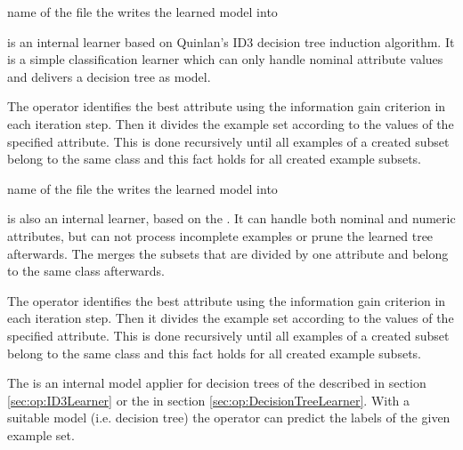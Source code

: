
\learnerio

\begin{parameters}
 name of the file the  writes the learned model into
\end{parameters}

\opdescr {} is an internal learner based on Quinlan's \cite{Quinlan/93b} 
ID3 decision tree induction algorithm. 
It is a simple classification learner which can
only handle nominal attribute values and delivers a decision tree as model.

The operator identifies the best attribute using the information gain criterion in each iteration step. 
Then it divides the example set according to the values of the specified attribute. 
This is done recursively until all examples of a created subset belong to the
same class and this fact holds for all created example subsets.



\learnerio

\begin{parameters}
 name of the file the  writes the learned model into
\end{parameters}

\opdescr {} is also an internal learner, based on
the . It can handle both nominal and numeric
attributes, but can not process incomplete examples or prune the learned tree
afterwards. The  merges the subsets that are divided
by one attribute and belong to the same class afterwards.

The operator identifies the best attribute using the information gain
criterion in each iteration step. 
Then it divides the example set according to the values of the specified attribute. 
This is done recursively until all examples of a created subset belong to the
same class and this fact holds for all created example subsets.
 



\applierio

\opdescr The  is an internal model applier for decision
trees of the  described in section \ref{sec:op:ID3Learner} or the 
 in section \ref{sec:op:DecisionTreeLearner}. 
With a suitable model (i.e. decision tree) the operator can predict the
labels of the given example set.



